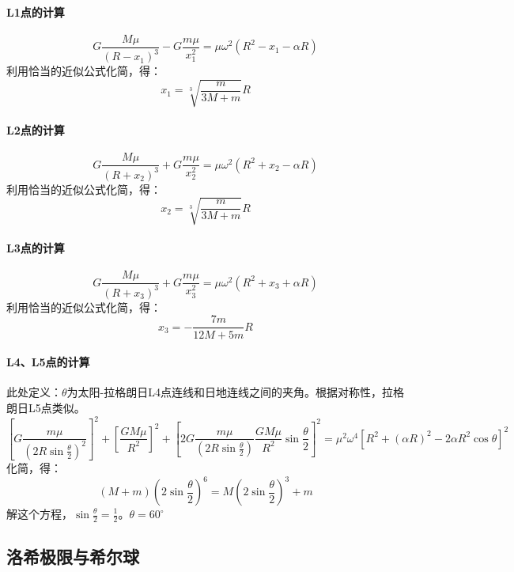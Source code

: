 \paragraph{L1点的计算}
\begin{equation}
	G\frac{M\mu}{(R-x_{1})^3}-G\frac{m\mu}{x_{1}^2}=\mu\omega^2(R^2-x_{1}-\alpha R)
\end{equation}
利用恰当的近似公式化简，得：
\begin{equation}
	x_{1}=\sqrt[3]{\frac{m}{3M+m}}R
\end{equation}
\paragraph{L2点的计算}
\begin{equation}
	G\frac{M\mu}{(R+x_{2})^3}+G\frac{m\mu}{x_{2}^2}=\mu\omega^2(R^2+x_{2}-\alpha R)
\end{equation}
利用恰当的近似公式化简，得：
\begin{equation}
	x_{2}=\sqrt[3]{\frac{m}{3M+m}}R
\end{equation}
\paragraph{L3点的计算}
\begin{equation}
	G\frac{M\mu}{(R+x_{3})^3}+G\frac{m\mu}{x_{3}^2}=\mu\omega^2(R^2+x_{3}+\alpha R)
\end{equation}
利用恰当的近似公式化简，得：
\begin{equation}
	x_{3}=-\frac{7m}{12M+5m}R
\end{equation}
\paragraph{L4、L5点的计算}
此处定义：$\theta$为太阳-拉格朗日L4点连线和日地连线之间的夹角。根据对称性，拉格朗日L5点类似。
\begin{equation}
	\left[G\frac{m\mu}{(2R\sin \frac{\theta}{2})^2}\right]^2+\left[\frac{GM\mu}{R^2}\right]^2+\left[2G\frac{m\mu}{(2R\sin\frac{\theta}{2})}\frac{GM\mu}{R^2}\sin \frac{\theta}{2}\right]^2=\mu^2\omega^4\left[R^2+(\alpha R)^2-2\alpha R^2 \cos \theta\right]^2
\end{equation}
化简，得：
\begin{equation}
	(M+m)(2\sin \frac{\theta}{2})^6=M(2\sin\frac{\theta}{2})^3+m
\end{equation}
解这个方程，$\sin \frac{\theta}{2}=\frac{1}{2}$。$\theta =60^\circ$
\subsection{洛希极限与希尔球}
